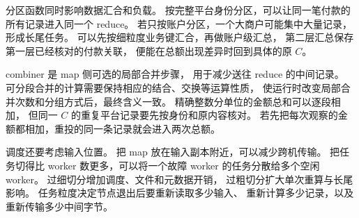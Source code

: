 分区函数同时影响数据汇合和负载。
按完整平台身份分区，可以让同一笔付款的所有记录进入同一个 reduce。
若只按账户分区，一个大商户可能集中大量记录，形成长尾任务。
可以先按细粒度业务键汇合，再做账户级汇总，
第二层汇总保存第一层已经核对的付款关联，
便能在总额出现差异时回到具体的原 $C$。

combiner 是 map 侧可选的局部合并步骤，
用于减少送往 reduce 的中间记录。
可分段合并的计算需要保持相应的结合、交换等运算性质，
使运行时改变局部合并次数和分组方式后，最终含义一致。
精确整数分单位的金额总和可以逐段相加，
但同一 $C$ 的重复平台记录要先按身份和原内容核对。
若先把每次观察的金额都相加，重投的同一条记录就会进入两次总额。

调度还要考虑输入位置。
把 map 放在输入副本附近，可以减少跨机传输。
把任务切得比 worker 数更多，可以将一个故障 worker 的任务分散给多个空闲 worker。
过细切分增加调度、文件和元数据开销，
过粗切分扩大单次重算与长尾影响。
任务粒度决定节点退出后要重新读取多少输入、
重新计算多少记录，以及重新传输多少中间字节。
